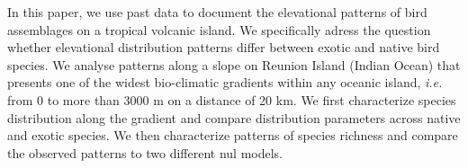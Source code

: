\documentclass{article}\usepackage[]{graphicx}\usepackage[]{color}
\begin{document}




In this paper, we use past data to document the elevational patterns of bird assemblages on a tropical volcanic island.  We specifically adress the question whether elevational distribution patterns differ between exotic and native bird species. We analyse patterns along a slope on Reunion Island (Indian Ocean) that presents one of the widest bio-climatic gradients within any oceanic island, \textit{i.e.} from 0 to more than 3000 m on a distance of 20 km. We first characterize species distribution along the gradient and compare distribution parameters across native and exotic species. We then characterize patterns of species richness and compare the observed patterns to two different nul models. 
\end{document}
